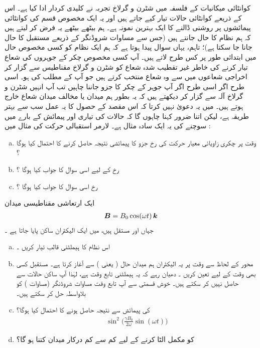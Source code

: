  کوانٹائی میکانیات کے  فلسفہ  میں شٹرن و گرلاخ تجربہ نے کلیدی کردار ادا کیا ہے۔ اس کے ذریعے کوانٹائی حالات تیار کیے جاتے ہیں اور یہ ایک مخصوص قسم کی کوانٹائی پیمائشوں پر روشنی ڈالنے کا ایک بہترین نمونہ ہے۔  ہم بیٹھے بیٹھے یہ فرض کر لیتے ہیں کہ ہم نظام کا  حال  جانتے ہیں  (جس سے مساوات شروڈنگر کے ذریعے مستقبل کا حال جانا جا سکتا ہے)؛  تاہم، یہاں    سوال پیدا ہوتا ہے کہ ہم ایک  نظام کو کسی مخصوص حال میں ابتدائی طور  پر  کس طرح   لاتے ہیں۔ آپ کسی مخصوص چکر کے جوہروں کی شعاع تیار کرنے کی خاطر غیر تقطیب  شدہ  شعاع کو شٹرن و گرلاخ مقناطیس سے گزار کر اخراجی شعاعوں میں سے وہ شعاع منتخب کرتے ہیں جو آپ کے مطلب کی ہو۔ اسی طرح اگر اسی طرح اگر آپ جوہر کے چکر کا  جزو جاننا چاہیں تب آپ انہیں شٹرن و گرلاخ آلہ  سے گزار کر دیکھتے ہیں کہ یہ بطور ہم میدان یا مخالف میدان شعاع خارج ہوتے ہیں۔ میں یہ دعویٰ  نہیں کرتا کہ اس مقصد کے حصول کا یہ عمل سب سے بہتر طریقہ ہے، لیکن اتنا ضرور کہنا چاہوں گا کہ حالات کی تیاری اور پیمائش کے بارے میں سوچنے کی  یہ ایک سادہ  مثال ہے۔ 
لارمر استقبالی حرکت کی    مثال    میں :
\begin{enumerate}[a.]
\item
وقت  پر چکری زاویائی معیار حرکت کی   رخ جزو کا  پیمائشی نتیجہ  حاصل کرنے کا احتمال کیا ہوگا ؟
\item
{} رخ کے لیے اسی سوال کا جواب کیا ہوگا ؟
\item 
{} رخ اسی سوال کا جواب کیا ہوگا ؟
\end{enumerate}
ایک ارتعاشی مقناطیسی میدان 
\begin{align*}
{\ensuremath{{\boldsymbol{B}}}} = B_0 \cos(\omega t) \,{\boldsymbol{k}}
\end{align*}
جہاں  اور  مستقل ہیں، میں ایک الیکٹران ساکن پایا جاتا ہے ۔
\begin{enumerate}[a.]
\item
اس نظام کا ہیملٹنی قالب تیار کریں ۔
\item
محور  کے لحاظ سے وقت  پر یہ الیکٹران  ہم  میدان حال ( یعنی )    سے آغاز  کرتا ہے۔ مستقبل   کسی بھی وقت کے لیے  تعین کریں ۔ دھیان رہے کہ یہ ہیملٹنی تابع وقت ہے، لہٰذا آپ ساکن حالات سے  حاصل نہیں کر سکتے ہیں۔ خوش قسمتی سے آپ تابع وقت مساوات شروڈنگر (مساوات  )  کو بلاواسطہ حل کر سکتے ہیں۔ 
\item
{} کی پیمائش سے   نتیجہ حاصل  ہونے کا احتمال کیا ہوگا؟  
\begin{align*}
\sin^2 \big ( \frac{\gamma B_0}{2 \omega} \sin(\omega t) \big )
\end{align*}
\item
{} کو مکمل الٹا کرنے کے لیے کم سے کم  درکار میدان  کتنا ہو گا؟   
\end{enumerate}
